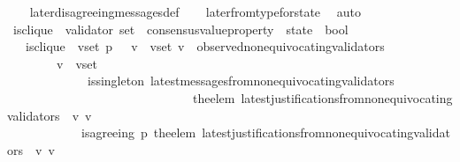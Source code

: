 \begin{isabellebody}
%
\isadelimproof
\ \ %
\endisadelimproof
%
\isatagproof
{}\isamarkupfalse%
\ later{\isacharunderscore}disagreeing{\isacharunderscore}messages{\isacharunderscore}def\isanewline
\ \ \isamarkupfalse%
\ later{\isacharunderscore}from{\isacharunderscore}type{\isacharunderscore}for{\isacharunderscore}state\ \isamarkupfalse%
\ auto%
\endisatagproof
{\isafoldproof}%
%
\isadelimproof
\isanewline
%
\endisadelimproof
\isanewline
\isanewline
\isanewline
\isanewline
\isanewline
\isanewline
\isanewline
\isanewline
\isanewline
{}\isamarkupfalse%
\ is{\isacharunderscore}clique\ {\isacharcolon}{\isacharcolon}\ {\isachardoublequoteopen}{\isacharparenleft}validator\ set\ {\isacharasterisk}\ consensus{\isacharunderscore}value{\isacharunderscore}property\ {\isacharasterisk}\ state{\isacharparenright}\ {\isasymRightarrow}\ bool{\isachardoublequoteclose}\isanewline
\ \isanewline
\ \ \ {\isachardoublequoteopen}is{\isacharunderscore}clique\ {\isacharequal}\ {\isacharparenleft}{\isasymlambda}{\isacharparenleft}v{\isacharunderscore}set{\isacharcomma}\ p{\isacharcomma}\ {\isasymsigma}{\isacharparenright}{\isachardot}\ {\isacharparenleft}{\isasymforall}\ v\ {\isasymin}\ v{\isacharunderscore}set{\isachardot}\ v\ {\isasymin}\ observed{\isacharunderscore}non{\isacharunderscore}equivocating{\isacharunderscore}validators\ {\isasymsigma}\ \ \isanewline
\ \ \ \ \ {\isasymand}\ {\isacharparenleft}{\isasymforall}\ \ v{\isacharprime}\ {\isasymin}\ v{\isacharunderscore}set{\isachardot}\ \isanewline
\ \ \ \ \ \ \ \ \ \ \ \ \ is{\isacharunderscore}singleton\ {\isacharparenleft}latest{\isacharunderscore}messages{\isacharunderscore}from{\isacharunderscore}non{\isacharunderscore}equivocating{\isacharunderscore}validators\ \isanewline
\ \ \ \ \ \ \ \ \ \ \ \ \ \ \ \ \ \ \ \ \ \ \ \ \ \ \ \ \ \ {\isacharparenleft}the{\isacharunderscore}elem\ {\isacharparenleft}latest{\isacharunderscore}justifications{\isacharunderscore}from{\isacharunderscore}non{\isacharunderscore}equivocating{\isacharunderscore}validators\ {\isasymsigma}\ v{\isacharparenright}{\isacharparenright}\ v{\isacharprime}{\isacharparenright}\isanewline
\ \ \ \ \ \ \ \ \ \ \ {\isasymand}\ is{\isacharunderscore}agreeing\ {\isacharparenleft}p{\isacharcomma}\ {\isacharparenleft}the{\isacharunderscore}elem\ {\isacharparenleft}latest{\isacharunderscore}justifications{\isacharunderscore}from{\isacharunderscore}non{\isacharunderscore}equivocating{\isacharunderscore}validators\ {\isasymsigma}\ v{\isacharparenright}{\isacharparenright}{\isacharcomma}\ v{\isacharprime}{\isacharparenright}\isanewline

\end{isabellebody}
